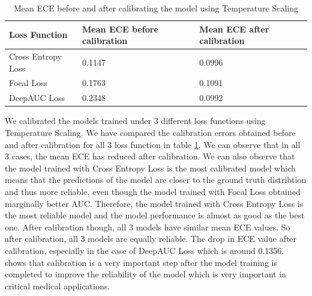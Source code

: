 \begin{table}[htbp]
\centering
\begin{tabular}{|p{1.8cm}|p{3.2cm}|p{3.2cm}|}
  \hline
   Loss Function & Mean ECE before calibration & Mean ECE after calibration \\
  \hline
  Cross Entropy Loss & 0.1147 & 0.0996 \\
  \hline  
  Focal Loss & 0.1763 & 0.1091 \\
  \hline
  DeepAUC Loss & 0.2348 & 0.0992 \\
  \hline
\end{tabular}
\caption{\label{ece} Mean ECE before and after calibrating the model using Temperature Scaling}
\end{table}

We calibrated the models trained under 3 different loss functions using Temperature Scaling. We have compared the calibration errors obtained before and after calibration for all 3 loss function in table \ref{ece}. We can observe that in all 3 cases, the mean ECE has reduced after calibration. We can also observe that the model trained with Cross Entropy Loss is the most calibrated model which means that the predictions of the model are closer to the ground truth distribtion and thus more reliable, even though the model trained with Focal Loss obtained marginally better AUC. Therefore, the model trained with Cross Entropy Loss is the most reliable model and the model performance is almost as good as the best one. After calibration though, all 3 models have similar mean ECE values. So after calibration, all 3 models are equally reliable. The drop in ECE value after calibration, especially in the case of DeepAUC Loss which is around 0.1356, shows that calibration is a very important step after the model training is completed to improve the reliability of the model which is very important in critical medical applications. 



